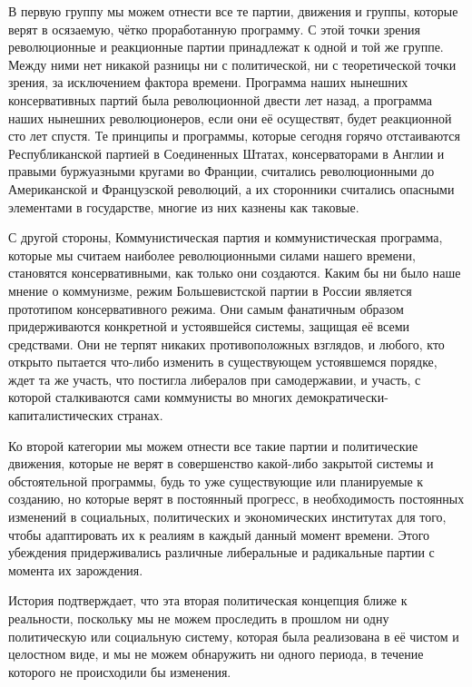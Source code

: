В первую группу мы можем отнести все те партии, движения и группы, которые верят в осязаемую, чётко проработанную программу. С этой точки зрения революционные и реакционные партии принадлежат к одной и той же группе. Между ними нет никакой разницы ни с политической, ни с теоретической точки зрения, за исключением фактора времени. Программа наших нынешних консервативных партий была революционной двести лет назад, а программа наших нынешних революционеров, если они её осуществят, будет реакционной сто лет спустя. Те принципы и программы, которые сегодня горячо отстаиваются Республиканской партией в Соединенных Штатах, консерваторами в Англии и правыми буржуазными кругами во Франции, считались революционными до Американской и Французской революций, а их сторонники считались опасными элементами в государстве, многие из них казнены как таковые.
 
С другой стороны, Коммунистическая партия и коммунистическая программа, которые мы считаем наиболее революционными силами нашего времени, становятся консервативными, как только они создаются. Каким бы ни было наше мнение о коммунизме, режим Большевистской партии в России является прототипом консервативного режима. Они самым фанатичным образом придерживаются конкретной и устоявшейся системы, защищая её всеми средствами. Они не терпят никаких противоположных взглядов, и любого, кто открыто пытается что-либо изменить в существующем устоявшемся порядке, ждет та же участь, что постигла либералов при самодержавии, и участь, с которой сталкиваются сами коммунисты во многих демократически-капиталистических странах.

Ко второй категории мы можем отнести все такие партии и политические движения, которые не верят в совершенство какой-либо закрытой системы и обстоятельной программы, будь то уже существующие или планируемые к созданию, но которые верят в постоянный прогресс, в необходимость постоянных изменений в социальных, политических и экономических институтах для того, чтобы адаптировать их к реалиям в каждый данный момент времени. Этого убеждения придерживались различные либеральные и радикальные партии с момента их зарождения.
 
История подтверждает, что эта вторая политическая концепция ближе к реальности, поскольку мы не можем проследить в прошлом ни одну политическую или социальную систему, которая была реализована в её чистом и целостном виде, и мы не можем обнаружить ни одного периода, в течение которого не происходили бы изменения.



